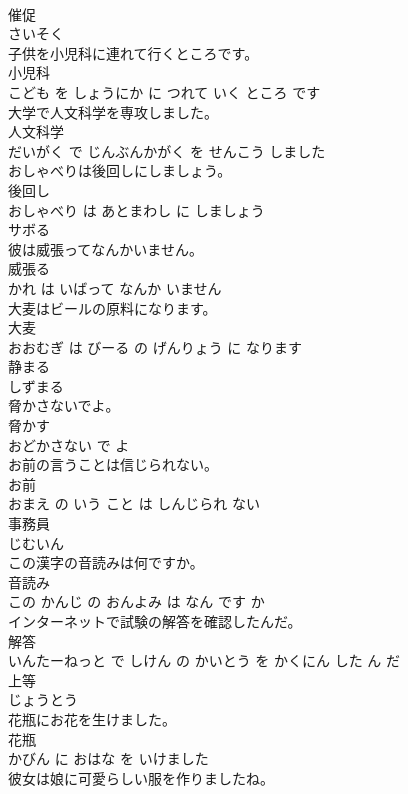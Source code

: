 \documentclass[8pt]{extreport}
\begin{document}
\begin{CJK}{UTF8}{min}
\\	催促	
\\	さいそく			
\\	子供を小児科に連れて行くところです。	
\\	小児科 
\\	こども を しょうにか に つれて いく ところ です			
\\	大学で人文科学を専攻しました。	
\\	人文科学 
\\	だいがく で じんぶんかがく を せんこう しました			
\\	おしゃべりは後回しにしましょう。	
\\	後回し 
\\	おしゃべり は あとまわし に しましょう			
\\	サボる	
\\	彼は威張ってなんかいません。	
\\	威張る 
\\	かれ は いばって なんか いません			
\\	大麦はビールの原料になります。	
\\	大麦 
\\	おおむぎ は びーる の げんりょう に なります			
\\	静まる	
\\	しずまる			
\\	脅かさないでよ。	
\\	脅かす 
\\	おどかさない で よ			
\\	お前の言うことは信じられない。	
\\	お前 
\\	おまえ の いう こと は しんじられ ない			
\\	事務員	
\\	じむいん			
\\	この漢字の音読みは何ですか。	
\\	音読み 
\\	この かんじ の おんよみ は なん です か			
\\	インターネットで試験の解答を確認したんだ。	
\\	解答 
\\	いんたーねっと で しけん の かいとう を かくにん した ん だ			
\\	上等	
\\	じょうとう			
\\	花瓶にお花を生けました。	
\\	花瓶 
\\	かびん に おはな を いけました			
\\	彼女は娘に可愛らしい服を作りましたね。	

\end{CJK}
\end{document}
